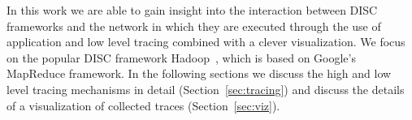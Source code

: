 In this work we are able to gain insight into the interaction between DISC 
frameworks and the network in which they are executed through the use of
application and low level tracing combined with a clever visualization. We 
focus on the popular DISC framework Hadoop~\cite{ApacheHadoop}, which is based on 
Google's MapReduce framework. In the following sections we discuss the high 
and low level tracing mechanisms in detail (Section~\ref{sec:tracing}) and 
discuss the details of a visualization of collected traces (Section~\ref{sec:viz}).

